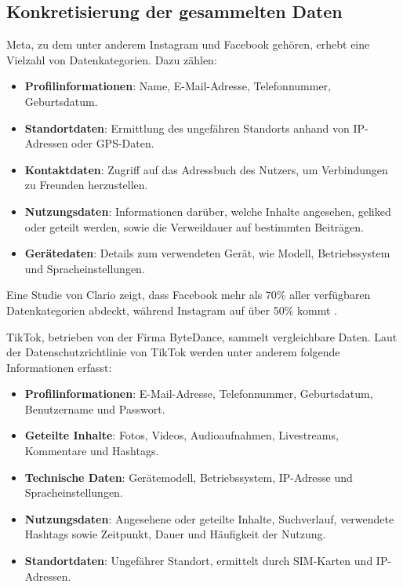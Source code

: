 \documentclass[12pt]{report}
\begin{document}
\subsection{Konkretisierung der gesammelten Daten}

Meta, zu dem unter anderem Instagram und Facebook gehören, erhebt eine Vielzahl von Datenkategorien. Dazu zählen:

\begin{itemize}
	\item \textbf{Profilinformationen}: Name, E-Mail-Adresse, Telefonnummer, Geburtsdatum.
	\item \textbf{Standortdaten}: Ermittlung des ungefähren Standorts anhand von IP-Adressen oder GPS-Daten.
	\item \textbf{Kontaktdaten}: Zugriff auf das Adressbuch des Nutzers, um Verbindungen zu Freunden herzustellen.
	\item \textbf{Nutzungsdaten}: Informationen darüber, welche Inhalte angesehen, geliked oder geteilt werden, sowie die Verweildauer auf bestimmten Beiträgen.
	\item \textbf{Gerätedaten}: Details zum verwendeten Gerät, wie Modell, Betriebssystem und Spracheinstellungen.
\end{itemize}

Eine Studie von Clario zeigt, dass Facebook mehr als 70\% aller verfügbaren Datenkategorien abdeckt, während Instagram auf über 50\% kommt \cite{zdnet2020}.

TikTok, betrieben von der Firma ByteDance, sammelt vergleichbare Daten. Laut der Datenschutzrichtlinie von TikTok werden unter anderem folgende Informationen erfasst:

\begin{itemize}
	\item \textbf{Profilinformationen}: E-Mail-Adresse, Telefonnummer, Geburtsdatum, Benutzername und Passwort.
	\item \textbf{Geteilte Inhalte}: Fotos, Videos, Audioaufnahmen, Livestreams, Kommentare und Hashtags.
	\item \textbf{Technische Daten}: Gerätemodell, Betriebssystem, IP-Adresse und Spracheinstellungen.
	\item \textbf{Nutzungsdaten}: Angesehene oder geteilte Inhalte, Suchverlauf, verwendete Hashtags sowie Zeitpunkt, Dauer und Häufigkeit der Nutzung.
	\item \textbf{Standortdaten}: Ungefährer Standort, ermittelt durch SIM-Karten und IP-Adressen.
\end{itemize}
\end{document}
